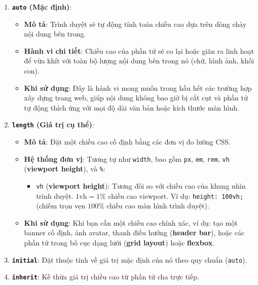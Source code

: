 \documentclass[11pt,oneside]{book}
\newcommand{\codeinline}[1]{\textcolor{accentOrange}{\texttt{#1}}}
\newcommand{\term}[1]{\textbf{\textcolor{primaryBlue}{#1}}}
\begin{document}
\begin{enumerate}[leftmargin=1.5em, itemsep=6pt, parsep=0pt]
    \item \textbf{\codeinline{auto} (Mặc định)}:
    \begin{itemize}[leftmargin=1.2em, itemsep=3pt, parsep=0pt]
        \item \textbf{Mô tả}: Trình duyệt sẽ tự động tính toán chiều cao dựa trên dòng chảy nội dung bên trong.
        \item \textbf{Hành vi chi tiết}: Chiều cao của phần tử sẽ co lại hoặc giãn ra linh hoạt để vừa khít với toàn bộ lượng nội dung bên trong nó (chữ, hình ảnh, khối con).
        \item \textbf{Khi sử dụng}: Đây là hành vi mong muốn trong hầu hết các trường hợp xây dựng trang web, giúp nội dung không bao giờ bị cắt cụt và phần tử tự động thích ứng với mọi độ dài văn bản hoặc kích thước màn hình.
    \end{itemize}

    \item \textbf{\codeinline{length} (Giá trị cụ thể)}:
    \begin{itemize}[leftmargin=1.2em, itemsep=3pt, parsep=0pt]
        \item \textbf{Mô tả}: Đặt một chiều cao cố định bằng các đơn vị đo lường CSS.
        \item \textbf{Hệ thống đơn vị}: Tương tự như \codeinline{width}, bao gồm \codeinline{px}, \codeinline{em}, \codeinline{rem}, \codeinline{vh} (\term{viewport height}), và \codeinline{\%}:
        \begin{itemize}[leftmargin=1.2em, itemsep=3pt, parsep=0pt]
            \item \codeinline{vh} (\term{viewport height}): Tương đối so với chiều cao của khung nhìn trình duyệt. $1\text{vh} = 1\%$ chiều cao viewport. Ví dụ: \codeinline{height: 100vh;} (chiếm trọn vẹn $100\%$ chiều cao màn hình trình duyệt).
        \end{itemize}
        \item \textbf{Khi sử dụng}: Khi bạn cần một chiều cao chính xác, ví dụ: tạo một banner cố định, ảnh avatar, thanh điều hướng (\term{header bar}), hoặc các phần tử trong bố cục dạng lưới (\term{grid layout}) hoặc \term{flexbox}.
    \end{itemize}

    \item \textbf{\codeinline{initial}}: Đặt thuộc tính về giá trị mặc định của nó theo quy chuẩn (\codeinline{auto}).
    \item \textbf{\codeinline{inherit}}: Kế thừa giá trị chiều cao từ phần tử cha trực tiếp.
\end{enumerate}
\end{document}
